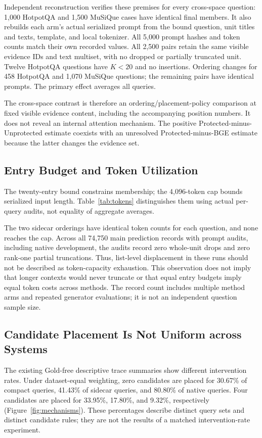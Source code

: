 \documentclass[11pt,a4paper]{article}
\begin{document}
Independent reconstruction verifies these premises for every cross-space
question: 1,000 HotpotQA and 1,500 MuSiQue cases have identical final members.
It also rebuilds each arm's actual serialized prompt from the bound question,
unit titles and texts, template, and local tokenizer. All 5,000 prompt hashes
and token counts match their own recorded values. All 2,500 pairs retain the
same visible evidence IDs and text multiset, with no dropped or partially
truncated unit. Twelve HotpotQA questions have $K<20$ and no insertions.
Ordering changes for 458 HotpotQA and 1,070 MuSiQue questions; the remaining
pairs have identical prompts. The primary effect averages all queries.

The cross-space contrast is therefore an ordering/placement-policy comparison
at fixed visible evidence content, including the accompanying position
numbers. It does not reveal an internal attention mechanism. The positive
Protected-minus-Unprotected estimate coexists with an unresolved
Protected-minus-BGE estimate because the latter changes the evidence set.

\subsection{Entry Budget and Token Utilization}
The twenty-entry bound constrains membership; the 4,096-token cap bounds
serialized input length. Table~\ref{tab:tokens} distinguishes them using
actual per-query audits, not equality of aggregate averages.

The two sidecar orderings have identical token counts for each question, and
none reaches the cap. Across all 74,750 main prediction records with prompt
audits, including native development, the audits record zero
whole-unit drops and zero rank-one partial truncations. Thus, list-level
displacement in these runs should not be described as token-capacity
exhaustion. This observation does not imply that longer contexts would never
truncate or that equal entry budgets imply equal token costs across methods.
The record count includes multiple method arms and repeated generator
evaluations; it is not an independent question sample size.

\subsection{Candidate Placement Is Not Uniform across Systems}
The existing Gold-free descriptive trace summaries show different intervention
rates. Under dataset-equal weighting, zero candidates are placed for 30.67\%
of compact queries, 41.43\% of sidecar queries, and 80.80\% of native queries.
Four candidates are placed for 33.95\%, 17.80\%, and 9.32\%, respectively
(Figure~\ref{fig:mechanisms}). These percentages describe distinct query sets
and distinct candidate rules; they are not the results of a matched
intervention-rate experiment.
\end{document}
